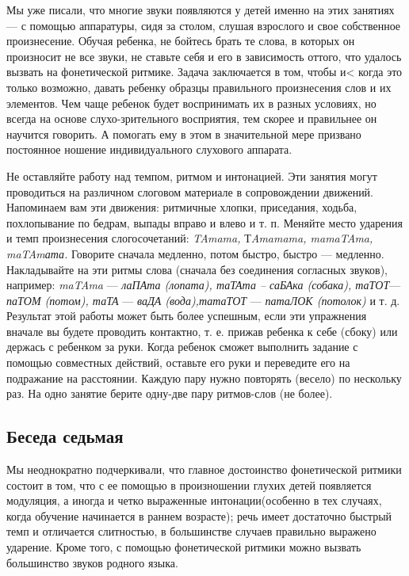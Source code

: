 \documentclass[a5paper]{book}
\renewcommand{\emph}[1]{\textit{#1}}
\begin{document}
Мы уже писали, что многие звуки появляются у детей именно на этих
занятиях --- с помощью аппаратуры, сидя за столом, слушая взрослого и
свое собственное произнесение. Обучая ребенка, не бойтесь брать те
слова, в которых он произносит не все звуки, не ставьте себя и его в
зависимость оттого, что удалось вызвать на фонетической ритмике. Задача
заключается в том, чтобы и\textless{} когда это только возможно, давать
ребенку образцы правильного произнесения слов и их элементов. Чем чаще
ребенок будет воспринимать их в разных условиях, но всегда на основе
слухо-зрительного восприятия, тем скорее и правильнее он научится
говорить. А помогать ему в этом в значительной мере призвано постоянное
ношение индивидуального слухового аппарата.

Не оставляйте работу над темпом, ритмом и интонацией. Эти занятия могут
проводиться на различном слоговом материале в сопровождении движений.
Напоминаем вам эти движения: ритмичные хлопки, приседания, ходьба,
похлопывание по бедрам, выпады вправо и влево и т. п. Меняйте место
ударения и темп произнесения слогосочетаний: \emph{TAmama,}
Т\emph{Amamama, mamaTAma, maTAmата.} Говорите сначала медленно, потом
быстро, быстро --- медленно. Накладывайте на эти ритмы слова (сначала
без соединения согласных звуков), например: \emph{maTAma} ---
\emph{лаПАта (лопата), таТАта -- саБАка (собака), таТОТ}--- \emph{паТОМ
(потом), таТА} --- \emph{ваДА (вода),татаТОТ} --- \emph{патаЛОК
(потолок)} и т. д. Результат этой работы может быть более успешным, если
эти упражнения вначале вы будете проводить контактно, т. е. прижав
ребенка к себе (сбоку) или держась с ребенком за руки. Когда ребенок
сможет выполнить задание с помощью совместных действий, оставьте его
руки и переведите его на подражание на расстоянии. Каждую пару нужно
повторять (весело) по нескольку раз. На одно занятие берите одну-две
пару ритмов-слов (не более).

\subsection*{Беседа седьмая}

Мы неоднократно подчеркивали, что главное достоинство фонетической
ритмики состоит в том, что с ее помощью в произношении глухих детей
появляется модуляция, а иногда и четко выраженные интонации(особенно в
тех случаях, когда обучение начинается в раннем возрасте); речь имеет
достаточно быстрый темп и отличается слитностью, в большинстве случаев
правильно выражено ударение. Кроме того, с помощью фонетической ритмики
можно вызвать большинство звуков родного языка.
\end{document}
